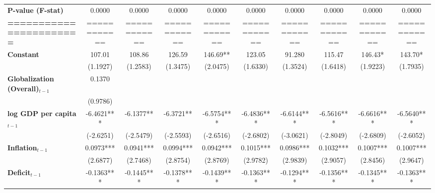 \begin{center}
\begin{tabular}{lccccccccc}
\textbf{P-value (F-stat)}          &     0.0000     &      0.0000      &      0.0000      &      0.0000      &      0.0000      &      0.0000      &      0.0000      &      0.0000      &      0.0000       \\
\textbf{=======================}   &  ============  &   ============   &   ============   &   ============   &   ============   &   ============   &   ============   &   ============   &   ============    \\
\textbf{Constant}                     &     107.01     &      108.86      &      126.59      &     146.69**     &      123.05      &      91.280      &      115.47      &     146.43*      &     143.70*       \\
\textbf{ }                         &    (1.1927)    &     (1.2583)     &     (1.3475)     &     (2.0475)     &     (1.6330)     &     (1.3524)     &     (1.6418)     &     (1.9223)     &     (1.7935)      \\
\textbf{Globalization (Overall)$_{t-1}$}               &     0.1370     &                  &                  &                  &                  &                  &                  &                  &                   \\
\textbf{ }                         &    (0.9786)    &                  &                  &                  &                  &                  &                  &                  &                   \\
\textbf{log GDP per capita$_{t-1}$}           &   -6.4621***   &    -6.1377**     &    -6.3721**     &    -6.5754***    &    -6.4836***    &    -6.6144***    &    -6.5616***    &    -6.6616***    &    -6.5640***     \\
\textbf{ }                         &   (-2.6251)    &    (-2.5479)     &    (-2.5593)     &    (-2.6516)     &    (-2.6802)     &    (-3.0621)     &    (-2.8049)     &    (-2.6809)     &    (-2.6052)      \\
\textbf{Inflation$_{t-1}$}      &   0.0973***    &    0.0941***     &    0.0994***     &    0.0942***     &    0.1015***     &    0.0986***     &    0.1032***     &    0.1007***     &    0.1007***      \\
\textbf{ }                         &    (2.6877)    &     (2.7468)     &     (2.8754)     &     (2.8769)     &     (2.9782)     &     (2.9839)     &     (2.9057)     &     (2.8456)     &     (2.9647)      \\
\textbf{Deficit$_{t-1}$}             &   -0.1363***   &    -0.1445***    &    -0.1378***    &    -0.1439***    &    -0.1363***    &    -0.1294***    &    -0.1356***    &    -0.1345***    &    -0.1363***     \\

\end{tabular}
\end{center}
